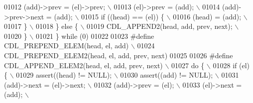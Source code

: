 \begin{DoxyCode}
01012 \textcolor{preprocessor}{    (add)->prev = (el)->prev;                                                                  \(\backslash\)}
01013 \textcolor{preprocessor}{    (el)->prev = (add);                                                                        \(\backslash\)}
01014 \textcolor{preprocessor}{    (add)->prev->next = (add);                                                                 \(\backslash\)}
01015 \textcolor{preprocessor}{    if ((head) == (el)) \{                                                                      \(\backslash\)}
01016 \textcolor{preprocessor}{      (head) = (add);                                                                          \(\backslash\)}
01017 \textcolor{preprocessor}{    \}                                                                                          \(\backslash\)}
01018 \textcolor{preprocessor}{  \} else \{                                                                                     \(\backslash\)}
01019 \textcolor{preprocessor}{    CDL\_APPEND2(head, add, prev, next);                                                        \(\backslash\)}
01020 \textcolor{preprocessor}{  \}                                                                                            \(\backslash\)}
01021 \textcolor{preprocessor}{\} while (0)}
01022 
01023 \textcolor{preprocessor}{#define CDL\_PREPEND\_ELEM(head, el, add)                                                        \(\backslash\)}
01024 \textcolor{preprocessor}{    CDL\_PREPEND\_ELEM2(head, el, add, prev, next)}
01025 
01026 \textcolor{preprocessor}{#define CDL\_APPEND\_ELEM2(head, el, add, prev, next)                                            \(\backslash\)}
01027 \textcolor{preprocessor}{do \{                                                                                           \(\backslash\)}
01028 \textcolor{preprocessor}{ if (el) \{                                                                                     \(\backslash\)}
01029 \textcolor{preprocessor}{  assert((head) != NULL);                                                                      \(\backslash\)}
01030 \textcolor{preprocessor}{  assert((add) != NULL);                                                                       \(\backslash\)}
01031 \textcolor{preprocessor}{  (add)->next = (el)->next;                                                                    \(\backslash\)}
01032 \textcolor{preprocessor}{  (add)->prev = (el);                                                                          \(\backslash\)}
01033 \textcolor{preprocessor}{  (el)->next = (add);                                                                          \(\backslash\)}

\end{DoxyCode}
